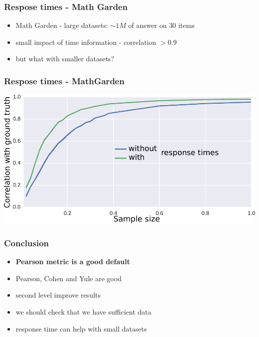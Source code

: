 \documentclass[xcolor=svgnames]{beamer}
\begin{document}
\begin{frame}
    \frametitle{Respose times - Math Garden}
    \begin{itemize}
        \item Math Garden - large datasets: $\sim 1M$ of answer on $30$ items
        \item small impact of time information - correlation $>0.9$
        \item but what with smaller datasets?
    \end{itemize}
\end{frame}
\begin{frame}
    \frametitle{Respose times - MathGarden}
    \centering
    \includegraphics[width=\linewidth]{figures/measure-convergence-time}
\end{frame}
\begin{frame}
    \frametitle{Conclusion}


    \Large
    \begin{itemize}
        \item \textbf{Pearson metric is a good default}
        \item Pearson, Cohen and Yule are good
        \item second level improve results
        \item we should check that we have sufficient data
        \item response time can help with small datasets
    \end{itemize}
\end{frame}
\end{document}
